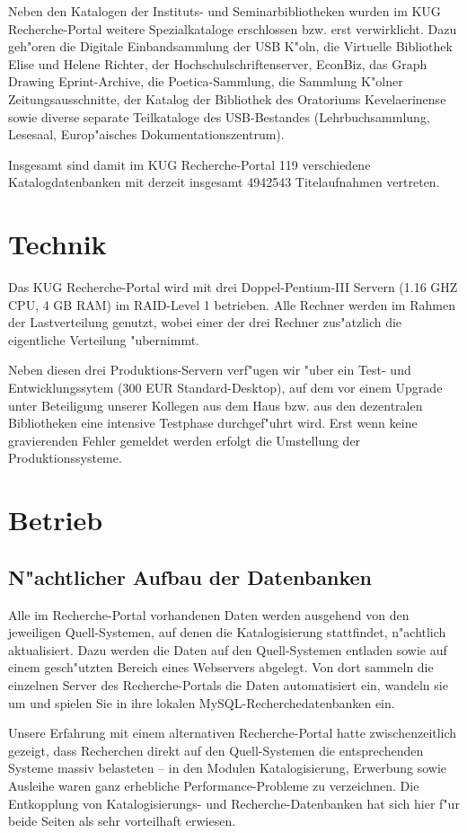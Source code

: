 \documentclass[11pt, twoside, a4paper, BCOR8mm, DIV12, bibtotoc,idxtotoc]{scrbook}
\begin{document}
Neben den Katalogen der Instituts- und Seminarbibliotheken wurden im
KUG Recherche-Portal weitere Spezialkataloge
erschlossen bzw. erst verwirklicht. Dazu geh"oren die Digitale
Einband\-samm\-lung der USB K"oln, die Virtuelle Bibliothek Elise und
Helene Richter, der Hoch\-schul\-schrif\-ten\-ser\-ver, EconBiz, das Graph
Drawing Eprint-Archive, die Poetica-Sammlung, die Sammlung K"olner
Zeitungsausschnitte, der Katalog der  Bibliothek des Oratoriums
Kevelaerinense sowie diverse separate Teilkataloge des USB-Bestandes
(Lehrbuchsammlung, Lesesaal, Europ"aisches Do\-ku\-men\-ta\-tions\-zen\-trum).

Insgesamt sind damit im KUG Recherche-Portal 119 verschiedene
Katalogdatenbanken mit derzeit insgesamt 4942543 Titelaufnahmen
vertreten.

\section{Technik}
Das KUG Recherche-Portal wird mit drei Doppel-Pentium-III Servern
(1.16 GHZ CPU, 4 GB RAM) im RAID-Level 1 betrieben. Alle Rechner
werden im Rahmen der Lastverteilung genutzt, wobei einer der drei
Rechner zus"atzlich die eigentliche Verteilung "ubernimmt.

Neben diesen drei Produktions-Servern verf"ugen wir "uber ein Test-
und Entwicklungssytem (300 EUR Standard-Desktop), auf dem vor einem
Upgrade unter Beteiligung unserer Kollegen aus dem Haus bzw. aus den
dezentralen Bibliotheken eine intensive Testphase durchgef"uhrt wird.
Erst wenn keine gravierenden Fehler gemeldet werden erfolgt die
Umstellung der Produktionssysteme.

\section{Betrieb}
\subsection{N"achtlicher Aufbau der Datenbanken}
Alle im Recherche-Portal vorhandenen Daten werden ausgehend von den
jeweiligen Quell-Sys\-te\-men, auf denen die Katalogisierung stattfindet,
n"achtlich aktualisiert. Dazu werden die Daten auf den Quell-Systemen
entladen sowie auf einem gesch"utzten Bereich eines Webservers
abgelegt. Von dort sammeln die einzelnen Server des Recherche-Portals
die Daten automatisiert ein, wandeln sie um und spielen Sie in ihre
lokalen MySQL-Recherchedatenbanken ein.

Unsere Erfahrung mit einem alternativen Recherche-Portal hatte
zwischenzeitlich gezeigt, dass Recherchen direkt auf den
Quell-Systemen die entsprechenden Systeme massiv belasteten -- in den
Modulen Katalogisierung, Erwerbung sowie Ausleihe waren ganz
erhebliche Performance-Probleme zu verzeichnen. Die Entkopplung von
Katalogisierungs- und Recherche-Datenbanken hat sich hier f"ur beide
Seiten als sehr vorteilhaft erwiesen.
\end{document}
